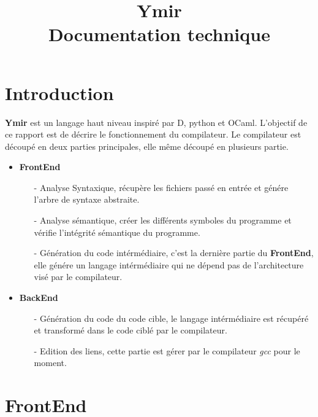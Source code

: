 \documentclass[a4paper, 11pt]{article}
\begin{document}
\title {\textbf{Ymir}\\
  Documentation technique}
\date {}
\maketitle
\pagebreak

\tableofcontents
\pagebreak

\section {Introduction}

\textbf{Ymir} est un langage haut niveau inspiré par D, python et OCaml. L'objectif de ce rapport est de décrire le fonctionnement du compilateur. Le compilateur est découpé en deux parties principales, elle même découpé en plusieurs partie.
\bigskip

\begin{itemize}
\item \textbf{FrontEnd}
  \begin{itemize}
  \item [-] Analyse Syntaxique, récupère les fichiers passé en entrée et génére l'arbre de syntaxe abstraite.
    \smallskip
    
  \item [-]  Analyse sémantique, créer les différents symboles du programme et vérifie l'intégrité sémantique du programme.
    \smallskip
    
  \item [-] Génération du code intérmédiaire, c'est la dernière partie du \textbf{FrontEnd}, elle génére un langage intérmédiaire qui ne dépend pas de l'architecture visé par le compilateur.
    \smallskip
  \end{itemize}
\item \textbf{BackEnd}
  \begin{itemize}
  \item [-] Génération du code du code cible, le langage intérmédiaire est récupéré et transformé dans le code ciblé par le compilateur.
    \smallskip
    
  \item [-] Edition des liens, cette partie est gérer par le compilateur \textit{gcc} pour le moment.
    \smallskip
    
  \end{itemize}
\end{itemize}

\section {FrontEnd}
\end{document}
